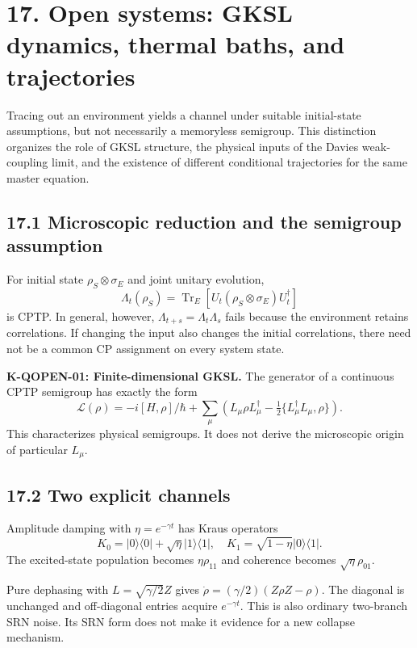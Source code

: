 \documentclass[
  11pt,
  oneside]{book}
\begin{document}
\chapter{17. Open systems: GKSL dynamics, thermal baths, and
trajectories}\label{ch-17}

Tracing out an environment yields a channel under suitable initial-state
assumptions, but not necessarily a memoryless semigroup. This
distinction organizes the role of GKSL structure, the physical inputs of
the Davies weak-coupling limit, and the existence of different
conditional trajectories for the same master equation.

\section{17.1 Microscopic reduction and the semigroup assumption}

For initial state \(\rho_S\otimes\sigma_E\) and joint unitary evolution,
\[
\Lambda_t(\rho_S)=\operatorname{Tr}_E[
U_t(\rho_S\otimes\sigma_E)U_t^\dagger]
\] is CPTP. In general, however, \(\Lambda_{t+s}=\Lambda_t\Lambda_s\)
fails because the environment retains correlations. If changing the
input also changes the initial correlations, there need not be a common
CP assignment on every system state.

\textbf{K-QOPEN-01: Finite-dimensional GKSL.} The generator of a
continuous CPTP semigroup has exactly the form \[
\mathcal L(\rho)=-i[H,\rho]/\hbar+
\sum_\mu\left(L_\mu\rho L_\mu^\dagger-
\tfrac12\{L_\mu^\dagger L_\mu,\rho\}\right).
\] This characterizes physical semigroups. It does not derive the
microscopic origin of particular \(L_\mu\).

\section{17.2 Two explicit channels}

Amplitude damping with \(\eta=e^{-\gamma t}\) has Kraus operators \[
K_0=|0\rangle\langle0|+\sqrt\eta|1\rangle\langle1|,
\quad K_1=\sqrt{1-\eta}|0\rangle\langle1|.
\] The excited-state population becomes \(\eta\rho_{11}\) and coherence
becomes \(\sqrt\eta\rho_{01}\).

Pure dephasing with \(L=\sqrt{\gamma/2}Z\) gives
\(\dot\rho=(\gamma/2)(Z\rho Z-\rho)\). The diagonal is unchanged and
off-diagonal entries acquire \(e^{-\gamma t}\). This is also ordinary
two-branch SRN noise. Its SRN form does not make it evidence for a new
collapse mechanism.
\end{document}
